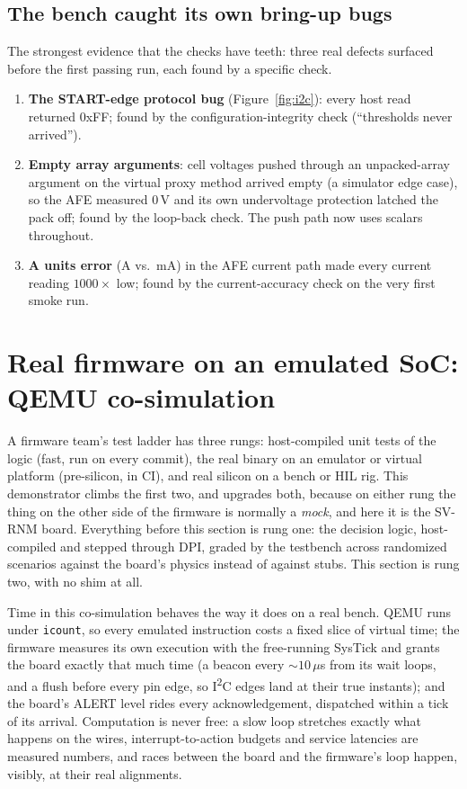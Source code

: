 \documentclass[11pt]{article}
\newcommand{\iic}{I\textsuperscript{2}C}
\begin{document}
\subsection*{The bench caught its own bring-up bugs}

The strongest evidence that the checks have teeth: three real defects
surfaced before the first passing run, each found by a specific check.

\begin{enumerate}
  \item \textbf{The START-edge protocol bug}
    (Figure~\ref{fig:i2c}): every host read returned 0xFF; found by
    the configuration-integrity check (``thresholds never arrived'').
  \item \textbf{Empty array arguments}: cell voltages pushed through
    an unpacked-array argument on the virtual proxy method arrived
    empty (a simulator edge case), so the AFE measured 0\,V and its
    own undervoltage protection latched the pack off; found by the
    loop-back check.  The push path now uses scalars throughout.
  \item \textbf{A units error} (A vs.\ mA) in the AFE current path
    made every current reading $1000\times$ low; found by the
    current-accuracy check on the very first smoke run.
\end{enumerate}

\section{Real firmware on an emulated SoC: QEMU co-simulation}
\label{sec:cosim}

A firmware team's test ladder has three rungs: host-compiled unit
tests of the logic (fast, run on every commit), the real binary on an
emulator or virtual platform (pre-silicon, in CI), and real silicon
on a bench or HIL rig.  This demonstrator climbs the first two,
and upgrades both, because on either rung the thing on the other side
of the firmware is normally a \emph{mock}, and here it is the SV-RNM
board.  Everything before this section is rung one: the decision
logic, host-compiled and stepped through DPI, graded by the
testbench across randomized scenarios against the board's physics
instead of against stubs.  This section is rung two, with no shim
at all.

Time in this co-simulation behaves the way it does on a real bench.
QEMU runs under \texttt{icount}, so every emulated instruction costs
a fixed slice of virtual time; the firmware measures its own
execution with the free-running SysTick and grants the board exactly
that much time (a beacon every ${\sim}10\,\mu$s from its wait loops,
and a flush before every pin edge, so \iic{} edges land at their
true instants); and the board's ALERT level rides every
acknowledgement, dispatched within a tick of its arrival.
Computation is never free: a slow loop stretches exactly what
happens on the wires, interrupt-to-action budgets and service
latencies are measured numbers, and races between the board and the
firmware's loop happen, visibly, at their real alignments.
\end{document}
